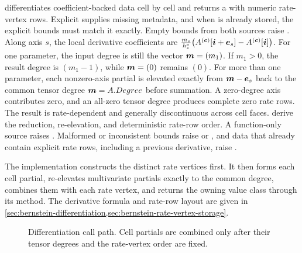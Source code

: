 \arghead {} differentiates coefficient-backed  data cell by cell and returns a  with numeric rate-vertex rows. Explicit  supplies missing metadata, and when  is already stored, the explicit bounds must match it exactly. Empty bounds from both sources raise . Along axis $s$, the local derivative coefficients are $\frac{m_s}{h_s^{\boldsymbol{c}}}\bigl(A^{(\boldsymbol{c})}[\boldsymbol{i}+\boldsymbol{e}_s]-A^{(\boldsymbol{c})}[\boldsymbol{i}]\bigr)$. For one parameter, the input degree is still the vector $\boldsymbol{m}=(m_1)$. If $m_1>0$, the result degree is $(m_1-1)$, while $\boldsymbol{m}=(0)$ remains $(0)$. For more than one parameter, each nonzero-axis partial is elevated exactly from $\boldsymbol{m}-\boldsymbol{e}_s$ back to the common tensor degree $\boldsymbol{m}=A.Degree$ before summation. A zero-degree axis contributes zero, and an all-zero tensor degree produces complete zero rate rows. The result is rate-dependent and generally discontinuous across cell faces.  derive the reduction, re-elevation, and deterministic rate-row order. A function-only source raises . Malformed or inconsistent bounds raise  or , and data that already contain explicit rate rows, including a previous derivative, raise .

The implementation constructs the distinct rate vertices first. It then forms each cell partial, re-elevates multivariate partials exactly to the common degree, combines them with each rate vertex, and returns the owning value class through its  method. The derivative formula and rate-row layout are given in \cref{sec:bernstein-differentiation,sec:bernstein-rate-vertex-storage}.

\begin{figure}[H]
\centering
{}
\caption{Differentiation call path. Cell partials are combined only after their tensor degrees and the rate-vertex order are fixed.}
\label{fig:rhodiff-call-path}
\end{figure}

